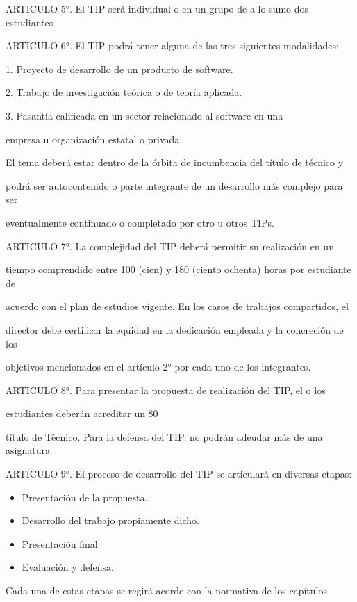 \documentclass[a4paper,12pt]{article}
\begin{document}
ARTICULO 5°. El TIP será individual o en un grupo de a lo sumo dos estudiantes

ARTICULO 6°. El TIP podrá tener alguna de las tres siguientes modalidades:

1. Proyecto de desarrollo de un producto de software.

2. Trabajo de investigación teórica o de teoría aplicada.

3. Pasantía calificada en un sector relacionado al software en una

empresa u organización estatal o privada.

El tema deberá estar dentro de la órbita de incumbencia del título de técnico y

podrá ser autocontenido o parte integrante de un desarrollo más complejo para ser

eventualmente continuado o completado por otro u otros TIPs.

ARTICULO 7°. La complejidad del TIP deberá permitir su realización en un

tiempo comprendido entre 100 (cien) y 180 (ciento ochenta) horas por estudiante de

acuerdo con el plan de estudios vigente. En los casos de trabajos compartidos, el

director debe certificar la equidad en la dedicación empleada y la concreción de los

objetivos mencionados en el artículo 2° por cada uno de los integrantes.

ARTICULO 8°. Para presentar la propuesta de realización del TIP, el o los

estudiantes deberán acreditar un 80%

título de Técnico. Para la defensa del TIP, no podrán adeudar más de una asignatura

ARTICULO 9°. El proceso de desarrollo del TIP se articulará en diversas etapas:

\begin{itemize}
 \item Presentación de la propuesta.
 \item Desarrollo del trabajo propiamente dicho.
 \item Presentación final
 \item Evaluación y defensa.
\end{itemize}

Cada una de estas etapas se regirá acorde con la normativa de los capítulos
\end{document}
